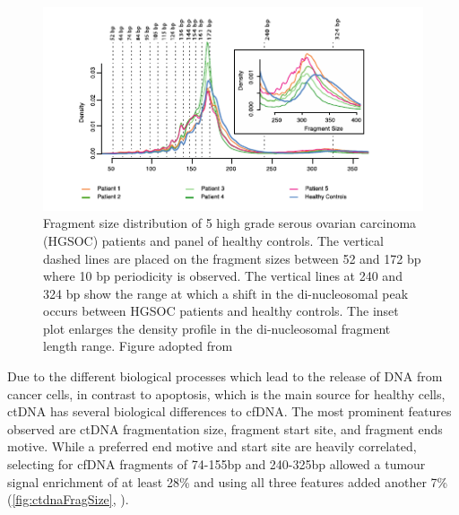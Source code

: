 \begin{figure}[ht]
\centering
\includegraphics[width=0.9\linewidth]{Figures/intro/fragmentSizeDist}
\caption[Fragment size distribution of ctDNA]{Fragment size distribution of 5 high grade serous
ovarian carcinoma (HGSOC) patients and panel of healthy controls. The vertical dashed lines are placed on the fragment sizes between 52 and 172 bp where 10 bp periodicity is observed. The vertical lines at 240 and 324 bp show the range at which a shift in the di-nucleosomal peak occurs between HGSOC patients and healthy controls. The inset plot enlarges the density profile in the di-nucleosomal fragment length range. Figure adopted from \textcite{Markus2022}}\label{fig:ctdnaFragSize}
\end{figure}

Due to the different biological processes which lead to the release of DNA from cancer cells, in contrast to apoptosis, which is the main source for healthy cells, ctDNA has several biological differences to cfDNA. The most prominent features observed are ctDNA fragmentation size, fragment start site, and fragment ends motive. While a preferred end motive and start site are heavily correlated, selecting for cfDNA fragments of 74-155bp and 240-325bp allowed a tumour signal enrichment of at least 28\% and using all three features added another 7\% (\autoref{fig:ctdnaFragSize}, \cite{Markus2022}). 
